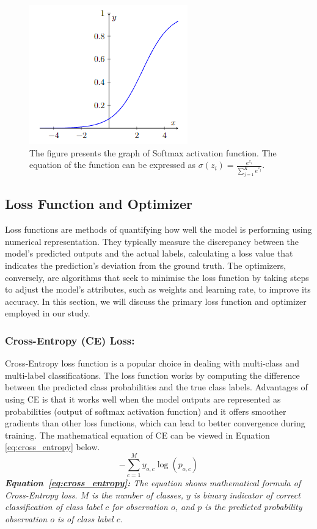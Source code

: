 \documentclass{l4proj}
\begin{document}
\begin{figure}[h]
    \centering
    \includegraphics[width=0.35\linewidth]{images/softmax_function.png}
    \caption{The figure presents the graph of Softmax activation function. The equation of the function can be expressed as $\sigma(z_i) = \frac{e^{z_{i}}}{\sum_{j=1}^K e^{z_{j}}}$.}
    \label{fig:enter-label}
\end{figure}

\newpage

\subsection{Loss Function and Optimizer}
Loss functions are methods of quantifying how well the model is performing using numerical representation. They typically measure the discrepancy between the model's predicted outputs and the actual labels, calculating a loss value that indicates the prediction's deviation from the ground truth. The optimizers, conversely, are algorithms that seek to minimise the loss function by taking steps to adjust the model's attributes, such as weights and learning rate, to improve its accuracy. In this section, we will discuss the primary loss function and optimizer employed in our study.

\subsubsection{Cross-Entropy (CE) Loss:}
Cross-Entropy loss function is a popular choice in dealing with multi-class and multi-label classifications. The loss function works by computing the difference between the predicted class probabilities and the true class labels. Advantages of using CE is that it works well when the model outputs are represented as probabilities (output of softmax activation function) and it offers smoother gradients than other loss functions, which can lead to better convergence during training. The mathematical equation of CE can be viewed in Equation \ref{eq:cross_entropy} below.
\begin{equation}
    -\sum_{c=1}^My_{o,c}\log(p_{o,c})
    \label{eq:cross_entropy}
\end{equation}
\textit{\textbf{Equation~\ref{eq:cross_entropy}:} The equation shows mathematical formula of Cross-Entropy loss. $M$ is the number of classes, $y$ is binary indicator of correct classification of class label $c$ for observation $o$, and $p$ is the predicted probability observation $o$ is of class label $c$.}
\end{document}
